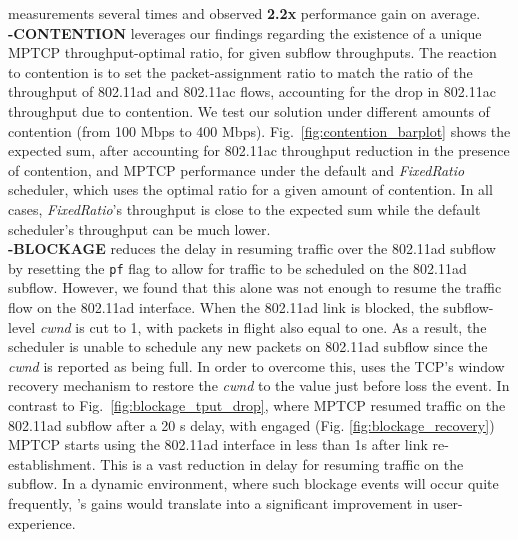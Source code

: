 measurements several times and observed \textbf{2.2x} performance gain on average.
\\
\noindent\textbf{\name-CONTENTION} leverages our findings regarding the 
existence of a unique MPTCP throughput-optimal ratio, for given subflow
throughputs. The reaction to contention is to set
the packet-assignment ratio to match the ratio of the throughput of
802.11ad and 802.11ac flows, accounting for the drop in 802.11ac
throughput due to contention. We test our solution under different
amounts of contention (from 100 Mbps to 400
Mbps). Fig.~\ref{fig:contention_barplot} shows the expected sum, after
accounting for 802.11ac throughput reduction in the presence of
contention, and MPTCP performance under the default
and \emph{FixedRatio} scheduler, which uses the optimal ratio for a
given amount of contention. In all cases, \emph{FixedRatio}'s
throughput is close to the expected sum while the default scheduler's
throughput can be much lower.
\\
\noindent\textbf{\name-BLOCKAGE} reduces the delay in resuming traffic over the 802.11ad
subflow by resetting the {{\tt pf}} flag to allow for traffic to be
scheduled on the 802.11ad subflow. However, we found that this alone
was not enough to resume the traffic flow on the 802.11ad
interface. When the 802.11ad link is blocked, the
subflow-level \emph{cwnd} is cut to 1, with packets in flight also
equal to one. As a result, the scheduler is unable to schedule any new
packets on 802.11ad subflow since the \emph{cwnd} is reported as being
full. In order to overcome this, \name uses the TCP's window recovery
mechanism to restore the \emph{cwnd} to the value just before loss the
event. In contrast to Fig.~\ref{fig:blockage_tput_drop}, where MPTCP resumed traffic on the
802.11ad subflow after a 20 s delay, with \name engaged (Fig. \ref{fig:blockage_recovery}) 
MPTCP starts using the 802.11ad interface in less than 1s after link re-establishment. This
is a vast reduction in delay for resuming traffic on the subflow. In a
dynamic environment, where such blockage events will occur quite
frequently, \name's gains would translate into a significant
improvement in user-experience.
